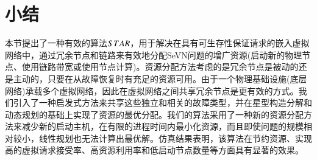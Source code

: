 \section{小结}
本节提出了一种有效的算法$STAR$，用于解决在具有可生存性保证请求的嵌入虚拟网络中，通过冗余节点和链路来有效地分配SeVN问题的增广资源(启动新的物理节点、使用链路带宽或使用节点计算)。资源分配方法考虑的是冗余节点是被动的还是主动的，只要在从故障恢复时有充足的资源可用。由于一个物理基础设施(底层网络)承载多个虚拟网络，因此在虚拟网络之间共享冗余节点是更有效的方式。我们引入了一种启发式方法来共享这些独立和相关的故障类型，并在星型构造分解和动态规划的基础上实现了资源的最优分配。我们的算法采用了一种新的资源分配方法来减少新的启动主机，在有限的进程时间内最小化资源，而且即使问题的规模相对较小，线性规划也无法计算出最优解。仿真结果表明，该算法在节约资源、实现高的虚拟请求接受率、高资源利用率和低启动节点数量等方面具有显著的效果。
